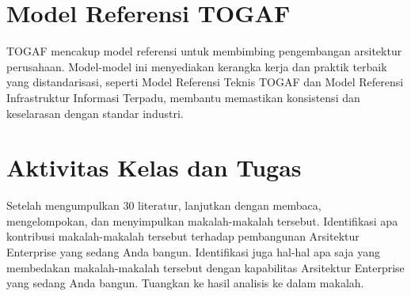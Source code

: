 \section{Model Referensi TOGAF}
TOGAF mencakup model referensi untuk membimbing pengembangan arsitektur perusahaan. Model-model ini menyediakan kerangka kerja dan praktik terbaik yang distandarisasi, seperti Model Referensi Teknis TOGAF dan Model Referensi Infrastruktur Informasi Terpadu, membantu memastikan konsistensi dan keselarasan dengan standar industri.

\section{Aktivitas Kelas dan Tugas}
Setelah mengumpulkan 30 literatur, lanjutkan dengan membaca, mengelompokan, dan menyimpulkan makalah-makalah tersebut. Identifikasi apa kontribusi makalah-makalah tersebut terhadap pembangunan Arsitektur Enterprise yang sedang Anda bangun. Identifikasi juga hal-hal apa saja yang membedakan makalah-makalah tersebut dengan kapabilitas Arsitektur Enterprise yang sedang Anda bangun. Tuangkan ke hasil analisis ke dalam makalah.
